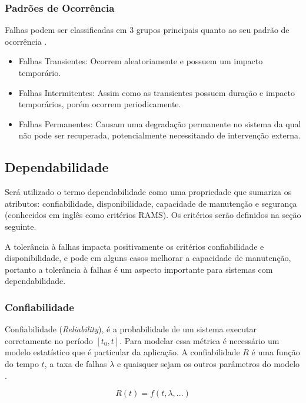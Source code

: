 \subsubsection{Padrões de Ocorrência}

Falhas podem ser classificadas em 3 grupos principais quanto ao seu padrão de ocorrência \cite{FaultTolerantSystems}.

\begin{itemize}
    \item Falhas Transientes: Ocorrem aleatoriamente e possuem um impacto temporário.

    \item Falhas Intermitentes: Assim como as transientes possuem duração e impacto temporários, porém ocorrem periodicamente.

    \item Falhas Permanentes: Causam uma degradação permanente no sistema da qual não pode ser recuperada, potencialmente necessitando de intervenção externa.
\end{itemize}

\subsection{Dependabilidade}

Será utilizado o termo dependabilidade como uma propriedade que sumariza os atributos:  confiabilidade, disponibilidade, capacidade de manutenção e segurança (conhecidos em inglês como critérios RAMS). Os critérios serão definidos na seção seguinte.

A tolerância à falhas impacta positivamente os critérios confiabilidade e disponibilidade, e pode em alguns casos melhorar a capacidade de manutenção, portanto a tolerância à falhas é um aspecto importante para sistemas com dependabilidade.

\subsubsection{Confiabilidade}

Confiabilidade (\textit{Reliability}), é a probabilidade de um sistema executar corretamente no período $[t_0, t]$. Para modelar essa métrica é necessário um modelo estatístico que é particular da aplicação. A confiabilidade $R$ é uma função do tempo $t$, a taxa de falhas $\lambda$ e quaisquer sejam os outros parâmetros do modelo \cite{FaultInjectionTechniques}.

\begin{equation}
    R(t) = f(t, \lambda, ...)
\end{equation}

